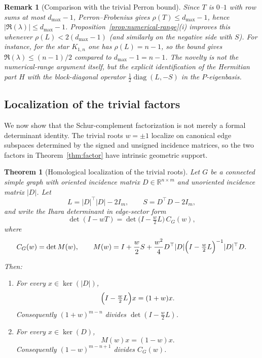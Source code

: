 \documentclass[11pt]{article}
\newtheorem{theorem}{Theorem}
\newtheorem{remark}{Remark}
\begin{document}
\begin{remark}[Comparison with the trivial Perron bound]
Since $T$ is $0$--$1$ with row sums at most $d_{\max}-1$, Perron--Frobenius gives
$\rho(T)\le d_{\max}-1$, hence $|\Re(\lambda)|\le d_{\max}-1$.
Proposition~\ref{prop:numerical-range}(i) improves this whenever
$\rho(L)<2(d_{\max}-1)$ (and similarly on the negative side with $S$).
For instance, for the star $K_{1,n}$ one has $\rho(L)=n-1$, so the bound gives
$\Re(\lambda)\le (n-1)/2$ compared to $d_{\max}-1=n-1$.
The novelty is not the numerical-range argument itself, but the explicit identification of the
Hermitian part $H$ with the block-diagonal operator $\frac12\operatorname{diag}(L,-S)$ in the $P$-eigenbasis.
\end{remark}


\subsection{Localization of the trivial factors}\label{subsec:localization-trivial}

We now show that the Schur-complement factorization is not merely a formal determinant identity. The trivial roots $w=\pm1$ localize on canonical edge subspaces determined by the signed and unsigned incidence matrices, so the two factors in Theorem~\ref{thm:factor} have intrinsic geometric support.

\begin{theorem}[Homological localization of the trivial roots]\label{thm:trivial-localization}
Let $G$ be a connected simple graph with oriented incidence matrix
$D\in\mathbb{R}^{n\times m}$ and unoriented incidence matrix $|D|$.
Let
\[
L = |D|^\top|D| - 2I_m,
\qquad
S = D^\top D - 2I_m,
\]
and write the Ihara determinant in edge-sector form
\[
\det(I-wT)=
\det\!\bigl(I-\tfrac{w}{2}L\bigr)\,
C_G(w),
\]
where
\[
C_G(w)=\det M(w),\qquad
M(w)=I+\frac{w}{2}S+
\frac{w^2}{4}D^\top|D|
\Bigl(I-\tfrac{w}{2}L\Bigr)^{-1}|D|^\top D.
\]

Then:

\begin{enumerate}
\item[(i)] For every $x\in\ker(|D|)$,
\[
\Bigl(I-\tfrac{w}{2}L\Bigr)x=(1+w)x.
\]
Consequently $(1+w)^{m-n}$ divides
$\det(I-\tfrac{w}{2}L)$.

\item[(ii)] For every $x\in\ker(D)$,
\[
M(w)x=(1-w)x.
\]
Consequently $(1-w)^{m-n+1}$ divides $C_G(w)$.
\end{enumerate}
\end{theorem}
\end{document}
